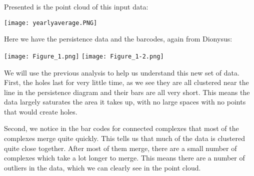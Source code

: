 \documentclass[12pt]{report}
\begin{document}
Presented is the point cloud of this input data:
\begin{center}
\texttt{[image: yearlyaverage.PNG]}
\end{center}


\clearpage
Here we have the persistence data and the barcodes, again from Dionysus:\par
\begin{center}
\texttt{[image: Figure\_1.png]}
\texttt{[image: Figure\_1-2.png]}
\end{center}

We will use the previous analysis to help us understand this new set of data. First, the holes last for very little time, as we see they are all clustered near the line in the persistence diagram and their bars are all very short. This means the data largely saturates the area it takes up, with no large spaces with no points that would create holes.

Second, we notice in the bar codes for connected complexes that most of the complexes merge quite quickly. This tells us that much of the data is clustered quite close together. After most of them merge, there are a small number of complexes which take a lot longer to merge. This means there are a number of outliers in the data, which we can clearly see in the point cloud.


\clearpage
\end{document}
